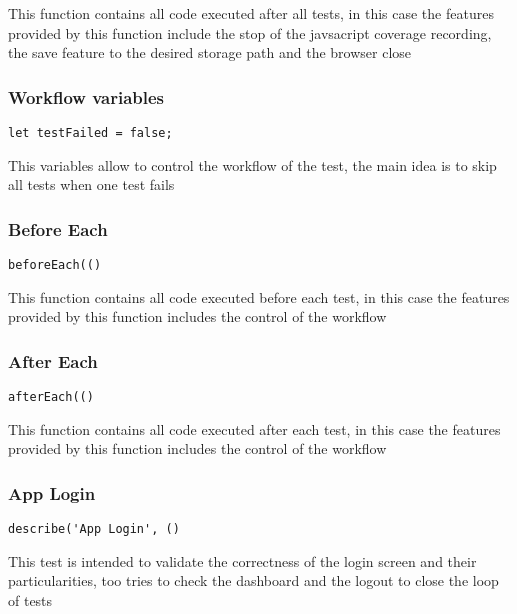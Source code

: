 \documentclass[a4paper]{article}
\begin{document}
This function contains all code executed after all tests, in this case the
features provided by this function include the stop of the javsacript coverage
recording, the save feature to the desired storage path and the browser close

\hypertarget{toc460}{}
\subsubsection{Workflow variables}

\begin{lstlisting}
let testFailed = false;
\end{lstlisting}

This variables allow to control the workflow of the test, the main idea is to
skip all tests when one test fails

\hypertarget{toc461}{}
\subsubsection{Before Each}

\begin{lstlisting}
beforeEach(()
\end{lstlisting}

This function contains all code executed before each test, in this case the
features provided by this function includes the control of the workflow

\hypertarget{toc462}{}
\subsubsection{After Each}

\begin{lstlisting}
afterEach(()
\end{lstlisting}

This function contains all code executed after each test, in this case the
features provided by this function includes the control of the workflow

\hypertarget{toc463}{}
\subsubsection{App Login}

\begin{lstlisting}
describe('App Login', ()
\end{lstlisting}

This test is intended to validate the correctness of the login screen and their
particularities, too tries to check the dashboard and the logout to close the
loop of tests
\end{document}
